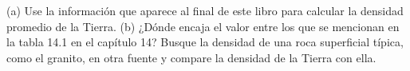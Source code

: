 \item (a) Use la información que aparece al final de este libro para calcular la densidad promedio de la Tierra. (b) ¿Dónde encaja el valor entre los que se mencionan en la tabla 14.1 en el capítulo 14? Busque la densidad de una roca superficial típica, como el granito, en otra fuente y compare la densidad de la Tierra con ella.
